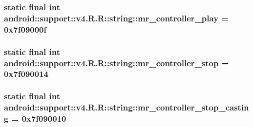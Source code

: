 \hypertarget{classandroid_1_1support_1_1v4_1_1_r_1_1string_a11134bcf14c14a0b064106fd5aea46f}{
\subsubsection[{mr\_\-controller\_\-play}]{\setlength{\rightskip}{0pt plus 5cm}static final int android::support::v4.R.R::string::mr\_\-controller\_\-play = 0x7f09000f}}
\label{classandroid_1_1support_1_1v4_1_1_r_1_1string_a11134bcf14c14a0b064106fd5aea46f}


\hypertarget{classandroid_1_1support_1_1v4_1_1_r_1_1string_dbd3fd864f87d49e93e84b51365ea98f}{
\subsubsection[{mr\_\-controller\_\-stop}]{\setlength{\rightskip}{0pt plus 5cm}static final int android::support::v4.R.R::string::mr\_\-controller\_\-stop = 0x7f090014}}
\label{classandroid_1_1support_1_1v4_1_1_r_1_1string_dbd3fd864f87d49e93e84b51365ea98f}


\hypertarget{classandroid_1_1support_1_1v4_1_1_r_1_1string_2fc0288729df8debaeb04d48db54f357}{
\subsubsection[{mr\_\-controller\_\-stop\_\-casting}]{\setlength{\rightskip}{0pt plus 5cm}static final int android::support::v4.R.R::string::mr\_\-controller\_\-stop\_\-casting = 0x7f090010}}
\label{classandroid_1_1support_1_1v4_1_1_r_1_1string_2fc0288729df8debaeb04d48db54f357}


